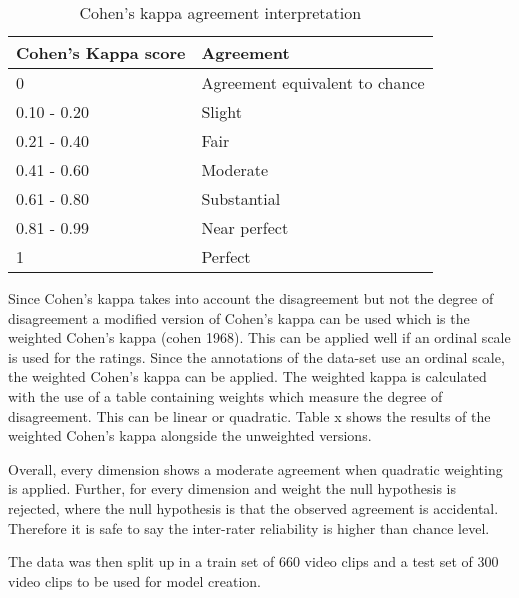 \begin{table}[]
\begin{tabular}{|p{3cm}|p{3cm}|}
\hline
\rowcolor[HTML]{EFEFEF} 
{\color[HTML]{41474D} Cohen's Kappa score} & {\color[HTML]{41474D} Agreement}                      \\ \hline
{\color[HTML]{41474D} 0}                   & {\color[HTML]{41474D} Agreement equivalent to chance} \\
{\color[HTML]{41474D} 0.10 - 0.20}         & {\color[HTML]{41474D} Slight}                         \\
{\color[HTML]{41474D} 0.21 - 0.40}         & {\color[HTML]{41474D} Fair}                           \\
{\color[HTML]{41474D} 0.41 - 0.60}         & {\color[HTML]{41474D} Moderate}                       \\
{\color[HTML]{41474D} 0.61 - 0.80}         & {\color[HTML]{41474D} Substantial}                    \\
{\color[HTML]{41474D} 0.81 - 0.99}         & {\color[HTML]{41474D} Near perfect}                   \\
{\color[HTML]{41474D} 1}                   & {\color[HTML]{41474D} Perfect}                        \\ \hline
\end{tabular}
\caption{Cohen's kappa agreement interpretation}
\label{tab:cohenkappainterpret}
\end{table}

Since Cohen's kappa takes into account the disagreement but not the degree of disagreement a modified version of Cohen's kappa can be used which is the weighted Cohen's kappa (cohen 1968). This can be applied well if an ordinal scale is used for the ratings. Since the annotations of the data-set use an ordinal scale, the weighted Cohen's kappa can be applied. The weighted kappa is calculated with the use of a table containing weights which measure the degree of disagreement. This can be linear or quadratic. Table x shows the results of the weighted Cohen's kappa alongside the unweighted versions. 

Overall, every dimension shows a moderate agreement when quadratic weighting is applied. Further, for every dimension and weight the null hypothesis is rejected, where the null hypothesis is that the observed agreement is accidental. Therefore it is safe to say the inter-rater reliability is higher than chance level. 

The data was then split up in a train set of 660 video clips and a test set of 300 video clips to be used for model creation. 

